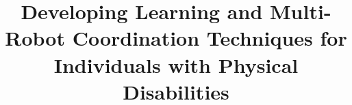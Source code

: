\documentclass{sigchi}
\begin{document}

\title{Developing Learning and Multi-Robot Coordination Techniques for Individuals with Physical Disabilities}



\maketitle
\end{document}
